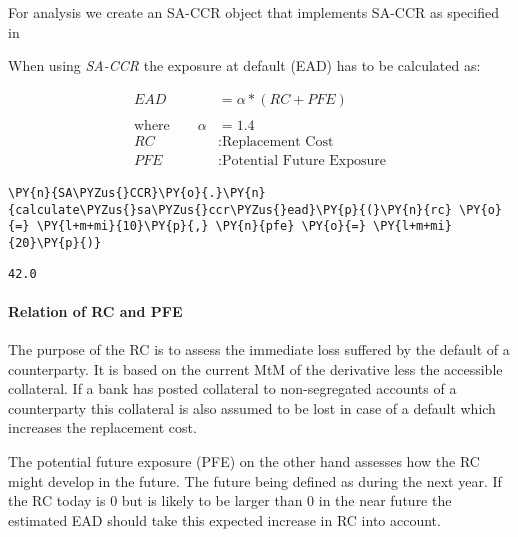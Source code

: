     

    
    For analysis we create an SA-CCR object that implements SA-CCR as
specified in \cite{SACCR}

    When using \emph{SA-CCR} the exposure at default (EAD) has to be
calculated as:

\begin{align*}
EAD &= \alpha * (RC + PFE)\\
\\
\text{where} \qquad \alpha&=1.4 \\
RC&: \text{Replacement Cost} \\
PFE&: \text{Potential Future Exposure}
\end{align*}

    \begin{tcolorbox}[breakable, size=fbox, boxrule=1pt, pad at break*=1mm,colback=cellbackground, colframe=cellborder]
\begin{Verbatim}[commandchars=\\\{\}]
\PY{n}{SA\PYZus{}CCR}\PY{o}{.}\PY{n}{calculate\PYZus{}sa\PYZus{}ccr\PYZus{}ead}\PY{p}{(}\PY{n}{rc} \PY{o}{=} \PY{l+m+mi}{10}\PY{p}{,} \PY{n}{pfe} \PY{o}{=} \PY{l+m+mi}{20}\PY{p}{)}
\end{Verbatim}
\end{tcolorbox}

            \begin{tcolorbox}[breakable, size=fbox, boxrule=.5pt, pad at break*=1mm, opacityfill=0]
\begin{Verbatim}[commandchars=\\\{\}]
42.0
\end{Verbatim}
\end{tcolorbox}
        
    \hypertarget{relation-of-rc-and-pfe}{%
\paragraph{Relation of RC and PFE}\label{relation-of-rc-and-pfe}}

The purpose of the RC is to assess the immediate loss suffered by the
default of a counterparty. It is based on the current MtM of the
derivative less the accessible collateral. If a bank has posted
collateral to non-segregated accounts of a counterparty this collateral
is also assumed to be lost in case of a default which increases the
replacement cost.

The potential future exposure (PFE) on the other hand assesses how the
RC might develop in the future. The future being defined as during the
next year. If the RC today is 0 but is likely to be larger than 0 in the
near future the estimated EAD should take this expected increase in RC
into account.

